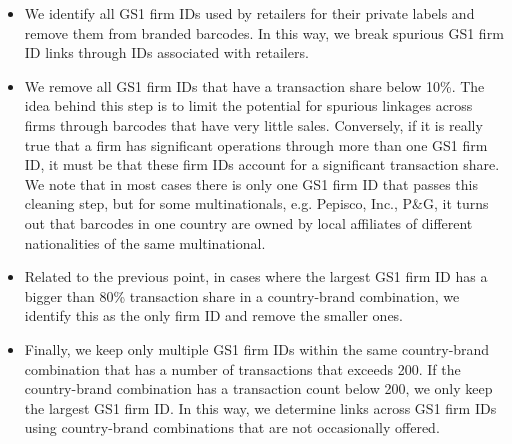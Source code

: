 \begin{itemize}
    \item   We identify all GS1 firm IDs used by retailers for their private labels and remove them from branded barcodes. In this way, we break spurious GS1 firm ID links through IDs associated with retailers. 
    \item   We remove all GS1 firm IDs that have a transaction share below 10\%. The idea behind this step is to limit the potential for spurious linkages across firms through barcodes that have very little sales. Conversely, if it is really true that a firm has significant operations through more than one GS1 firm ID, it must be that these firm IDs account for a significant transaction share. We note that in most cases there is only one GS1 firm ID that passes this cleaning step, but for some multinationals, e.g. Pepisco, Inc., P\&G, it turns out that barcodes in one country are owned by local affiliates of different nationalities of the same multinational. 
    \item   Related to the previous point, in cases where the largest GS1 firm ID has a bigger than 80\% transaction share in a country-brand combination, we identify this as the only firm ID and remove the smaller ones. 
    \item   Finally, we keep only multiple GS1 firm IDs within the same country-brand combination that has a number of transactions that exceeds 200. If the country-brand combination has a transaction count below 200, we only keep the largest GS1 firm ID. In this way, we determine links across GS1 firm IDs using country-brand combinations that are not occasionally offered. 
\end{itemize}

